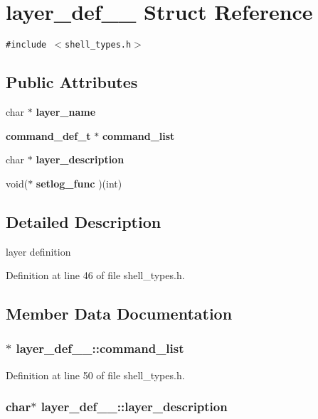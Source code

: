 \section{layer\_\-def\_\-\_\- Struct Reference}
\label{structlayer__def____}
{\tt \#include $<$shell\_\-types.h$>$}

\subsection*{Public Attributes}
\begin{CompactItemize}
\item 
char $\ast$ {\bf layer\_\-name}
\item 
{\bf command\_\-def\_\-t} $\ast$ {\bf command\_\-list}
\item 
char $\ast$ {\bf layer\_\-description}
\item 
void($\ast$ {\bf setlog\_\-func} )(int)
\end{CompactItemize}


\subsection{Detailed Description}
layer definition 

Definition at line 46 of file shell\_\-types.h.

\subsection{Member Data Documentation}
\subsubsection[{command\_\-list}]{$\ast$ {\bf layer\_\-def\_\-\_\-::command\_\-list}}\label{structlayer__def_____fd47e95d6f7af78b82d58856a08d5838}




Definition at line 50 of file shell\_\-types.h.
\subsubsection[{layer\_\-description}]{\setlength{\rightskip}{0pt plus 5cm}char$\ast$ {\bf layer\_\-def\_\-\_\-::layer\_\-description}}\label{structlayer__def_____fe53dd726108b2daf0a682db98ff2552}




